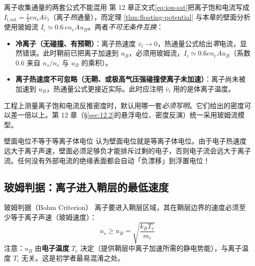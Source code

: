 \documentclass[12pt,a4paper,openany,oneside]{book}
\begin{document}
\begin{warning}{离子收集通量的两套公式不能混用}{}
第 12 章正文式\eqref{eq:ion-sat}把离子饱和电流写成 $I_{\mathrm{i,sat}} = \frac{1}{2}en_iA\bar{v}_i$（离子\emph{热}通量），而定理 \ref{thm:floating-potential} 与本章的壁面分析使用玻姆流 $I_i \simeq 0.6\,en_eAu_B$。两者\emph{不可无条件互换}：
\begin{itemize}
    \item \textbf{冷离子（无碰撞、有预鞘）}：离子热速度 $\bar v_i\to 0$，热通量公式给出\emph{零}电流，显然错误。此时鞘前已把离子加速到 $u_B$，必须用玻姆流，$I_i \simeq 0.6en_eAu_B$（系数 $0.6$ 来自 $n_s/n_e$ 与 $u_B$ 的乘积）。
    \item \textbf{离子热速度不可忽略（无鞘、或极高气压强碰撞使离子未加速）}：离子尚未被加速到 $u_B$，热通量公式更接近实际。此时应注明 $\bar v_i$ 用的是体离子温度。
\end{itemize}
工程上测量离子饱和电流反推密度时，默认用哪一套\emph{必须写明}。它们给出的密度可以差一倍以上。第 12 章（\S\ref{sec:12.2}的悬浮电位、密度反演）统一采用玻姆流模型。
\end{warning}

\begin{warning}{壁面电位不等于等离子体电位}{}
认为壁面电位就是等离子体电位。由于电子热速度远大于离子声速，壁面必须足够负才能排斥过剩的电子，否则电子流会远大于离子流。任何没有外部电流的绝缘表面都会自动「负漂移」到浮置电位！
\end{warning}

\subsection{玻姆判据：离子进入鞘层的最低速度}

\begin{theorem}{玻姆判据（Bohm Criterion）}{}{}
\label{thm:bohm-criterion}
离子要进入鞘层区域，其在鞘层边界的速度必须至少等于离子声速（玻姆速度）：
\begin{equation}
\label{eq:bohm-criterion}
u_s \ge u_B = \sqrt{\frac{k_B T_e}{m_i}}
\end{equation}
注意：$u_B$ 由\textbf{电子温度} $T_e$ 决定（提供鞘层中离子加速所需的静电势能），与离子温度 $T_i$ 无关。这是初学者最易混淆之处。
\end{theorem}
\end{document}
